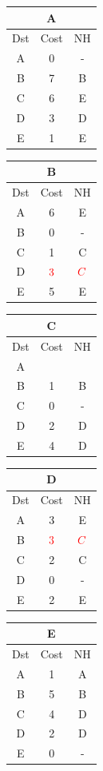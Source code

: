 \documentclass[10pt]{article}
\begin{document}
	\begin{table}[h!]
		\begin{tabular}{|c||c||c|}
 			\hline
	 		\multicolumn{3}{|c|}{A} \\
 			\hline
 			Dst & Cost & NH\\
 			\hline
 			A & 0 & - \\
 			B & 7 & B \\
 			C & 6 & E  \\
 			D & 3 & D \\
 			E & 1 & E \\
 			\hline
		\end{tabular}
		\begin{tabular}{|c||c||c|}
 			\hline
	 		\multicolumn{3}{|c|}{B} \\
 			\hline
 			Dst & Cost & NH\\
 			\hline
 			A & 6 & E \\
 			B & 0 & - \\
 			C & 1 & C  \\
 			D & $\color{red} 3$  & $\color{red} C$ \\
 			E & 5 & E \\
 			\hline
		\end{tabular}
		\begin{tabular}{|c||c||c|}
 			\hline
	 		\multicolumn{3}{|c|}{C} \\
 			\hline
 			Dst & Cost & NH\\
 			\hline
 			A &   &   \\
 			B & 1 & B \\
 			C & 0 & - \\
 			D & 2 & D \\
 			E & 4 & D \\
 			\hline
		\end{tabular}
		\begin{tabular}{|c||c||c|}
 			\hline
	 		\multicolumn{3}{|c|}{D} \\
 			\hline
 			Dst & Cost & NH\\
 			\hline
 			A & 3 & E \\
 			B & $\color{red} 3$  & $\color{red} C$ \\
 			C & 2 & C \\
 			D & 0 & - \\
 			E & 2 & E \\
 			\hline
		\end{tabular}
		\begin{tabular}{|c||c||c|}
 			\hline
	 		\multicolumn{3}{|c|}{E} \\
 			\hline
 			Dst & Cost & NH\\
 			\hline
 			A & 1 & A \\
 			B & 5 & B \\
 			C & 4 & D  \\
 			D & 2 & D \\
 			E & 0 & - \\
 			\hline
		\end{tabular}
	\end{table}
\end{document}

